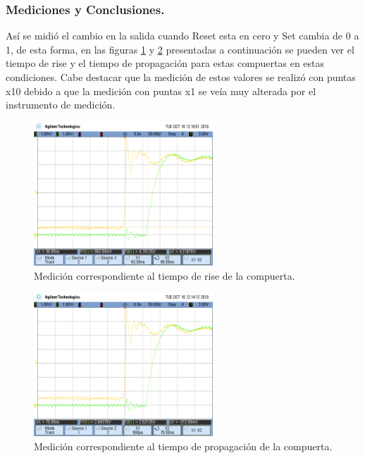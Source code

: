 \subsubsection{Mediciones y Conclusiones.}
%
\noindent
Así se midió el cambio en la salida cuando Reset esta en cero y Set cambia de 0 a 1, de esta forma, en las figuras \ref{ej6_latch_imagen1} y \ref{ej6_latch_imagen2} presentadas a continuación se pueden ver el tiempo de rise y el tiempo de propagación para estas compuertas en estas condiciones. Cabe destacar que la medición de estos valores se realizó con puntas x10 debido a que la medición con puntas x1 se veía muy alterada por el instrumento de medición.
\noindent
\begin{figure}[H]
    \centering
        \centering
        \includegraphics[width=0.6\textwidth]{figs/Ej6/sr_trise.png} %
         \caption{Medición correspondiente al tiempo de rise de la compuerta.}
         \label{ej6_latch_imagen1}
\end{figure}
%
%
\begin{figure}[H]
    \centering
        \centering
        \includegraphics[width=0.6\textwidth]{figs/Ej6/sr_tplhx10.png} %
         \caption{Medición correspondiente al tiempo de propagaci\'on de la compuerta.}
         \label{ej6_latch_imagen2}
\end{figure}

